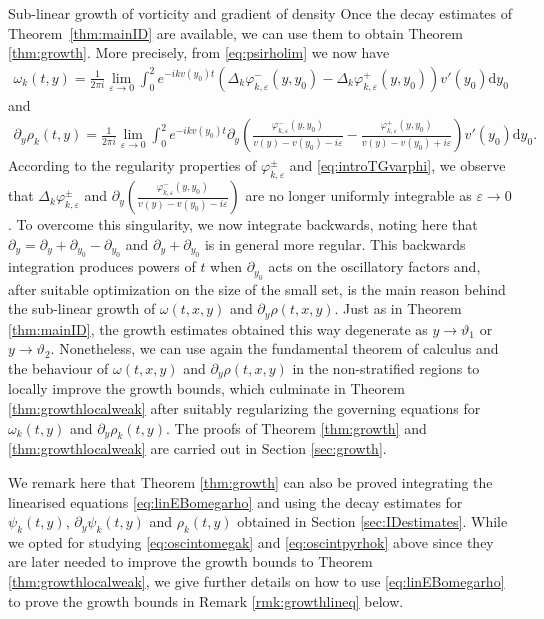 \documentclass[11pt,reqno]{amsproc}
\makeatletter
\renewcommand\subsection{\@startsection{subsection}{2}%
\normalparindent{.5\linespacing\@plus.7\linespacing}{-.5em}
{\normalfont\bfseries}}
\theoremstyle{definition}
\numberwithin{equation}{section}
\renewcommand{\d}{\mathrm{d}}
\newcommand{\ep}{\varepsilon}
\makeatother
\begin{document}
\subsection{Sub-linear growth of vorticity and gradient of density}
Once the decay estimates of Theorem~\ref{thm:mainID} are available, we can use them to obtain Theorem \ref{thm:growth}. More precisely, from \eqref{eq:psirholim} we now have
\begin{align}\label{eq:oscintomegak}
\omega_k(t,y) = \frac{1}{2 \pi i}\lim_{\ep\rightarrow 0}\int_0^2 e^{-ikv(y_0)t}\left( \Delta_k\varphi_{k,\ep}^-(y,y_0) - \Delta_k \varphi_{k,\ep}^+(y,y_0) \right) v'(y_0) \d y_0
\end{align} 
and
\begin{align}\label{eq:oscintpyrhok}
\partial_y\rho_k(t,y) = \frac{1}{2 \pi i}\lim_{\ep\rightarrow 0}\int_0^2 e^{-ikv(y_0)t}\partial_y\left( \frac{\varphi_{k,\ep}^-(y,y_0)}{v(y) - v(y_0) - i\ep} - \frac{\varphi_{k,\ep}^+(y,y_0)}{v(y) - v(y_0) + i\ep} \right) v'(y_0) \d y_0.
\end{align} 
According to the regularity properties of $\varphi_{k,\ep}^\pm$ and \eqref{eq:introTGvarphi}, we observe that $\Delta_k\varphi_{k,\ep}^\pm$ and $\partial_y\left( \frac{\varphi_{k,\ep}^-(y,y_0)}{v(y) - v(y_0) - i\ep} \right)$ are no longer uniformly integrable as $\ep\rightarrow 0$. To overcome this singularity, we now integrate backwards, noting here that $\partial_y = \partial_y + \partial_{y_0} - \partial_{y_0}$ and $\partial_y+\partial_{y_0}$ is in general more regular. This backwards integration produces powers of $t$ when $\partial_{y_0}$ acts on the oscillatory factors and, after suitable optimization on the size of the small set, is the main reason behind the sub-linear growth of $\omega(t,x,y)$ and $\partial_y\rho(t,x,y)$. Just as in Theorem \ref{thm:mainID}, the growth estimates obtained this way degenerate as $y\rightarrow\vartheta_1$ or $y\rightarrow \vartheta_2$. Nonetheless, we can use again the fundamental theorem of calculus and the behaviour of $\omega(t,x,y)$ and $\partial_y\rho(t,x,y)$ in the non-stratified regions to locally improve the growth bounds, which culminate in Theorem \ref{thm:growthlocalweak} after suitably regularizing the governing equations for $\omega_k(t,y)$ and $\partial_y\rho_k(t,y)$. The proofs of Theorem \ref{thm:growth} and \ref{thm:growthlocalweak} are carried out in Section \ref{sec:growth}.

We remark here that Theorem \ref{thm:growth} can also be proved integrating the linearised equations \eqref{eq:linEBomegarho} and using the decay estimates for $\psi_k(t,y)$, $\partial_y\psi_k(t,y)$ and $\rho_k(t,y)$ obtained in Section \ref{sec:IDestimates}. While we opted for studying \eqref{eq:oscintomegak} and \eqref{eq:oscintpyrhok} above since they are  later needed to improve the growth bounds to Theorem \ref{thm:growthlocalweak}, we give further details on how to use \eqref{eq:linEBomegarho} to prove the growth bounds in Remark \ref{rmk:growthlineq} below.
\end{document}
